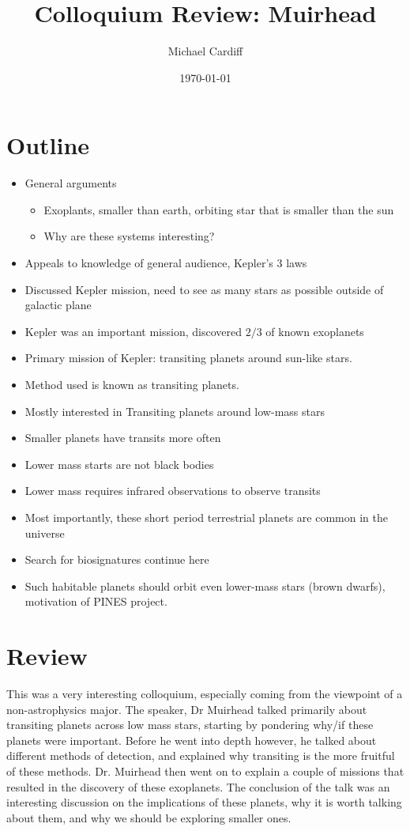 \documentclass[12pt]{article}
\title{\vspace{-3em}Colloquium Review: Muirhead}
\author{Michael Cardiff}
\date{\today}
\begin{document}
\maketitle
\section{Outline}
\begin{itemize}
\item General arguments
  \begin{itemize}
  \item Exoplants, smaller than earth, orbiting star that is smaller than the sun
  \item Why are these systems interesting?
  \end{itemize}
\item Appeals to knowledge of general audience, Kepler's 3 laws
\item Discussed Kepler mission, need to see as many stars as possible outside of galactic plane
\item Kepler was an important mission, discovered $2/3$ of known exoplanets
\item Primary mission of Kepler: transiting planets around sun-like stars. 
\item Method used is known as transiting planets. 
\item Mostly interested in Transiting planets around low-mass stars
\item Smaller planets have transits more often
\item Lower mass starts are not black bodies
\item Lower mass requires infrared observations to observe transits
\item Most importantly, these short period terrestrial planets are common in the universe
\item Search for biosignatures continue here 
\item Such habitable planets should orbit even lower-mass stars (brown dwarfs), motivation of PINES project. 
\end{itemize}
\pagebreak
\section{Review}
This was a very interesting colloquium, especially coming from the viewpoint of a non-astrophysics major. The speaker, Dr Muirhead talked primarily about transiting planets across low mass stars, starting by pondering why/if these planets were important. Before he went into depth however, he talked about different methods of detection, and explained why transiting is the more fruitful of these methods. Dr. Muirhead then went on to explain a couple of missions that resulted in the discovery of these exoplanets. The conclusion of the talk was an interesting discussion on the implications of these planets, why it is worth talking about them, and why we should be exploring smaller ones.
\end{document}

